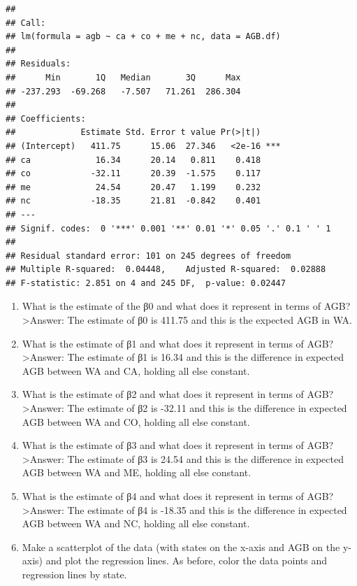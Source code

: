 \documentclass[
]{article}
\begin{document}
\begin{verbatim}
## 
## Call:
## lm(formula = agb ~ ca + co + me + nc, data = AGB.df)
## 
## Residuals:
##      Min       1Q   Median       3Q      Max 
## -237.293  -69.268   -7.507   71.261  286.304 
## 
## Coefficients:
##             Estimate Std. Error t value Pr(>|t|)    
## (Intercept)   411.75      15.06  27.346   <2e-16 ***
## ca             16.34      20.14   0.811    0.418    
## co            -32.11      20.39  -1.575    0.117    
## me             24.54      20.47   1.199    0.232    
## nc            -18.35      21.81  -0.842    0.401    
## ---
## Signif. codes:  0 '***' 0.001 '**' 0.01 '*' 0.05 '.' 0.1 ' ' 1
## 
## Residual standard error: 101 on 245 degrees of freedom
## Multiple R-squared:  0.04448,    Adjusted R-squared:  0.02888 
## F-statistic: 2.851 on 4 and 245 DF,  p-value: 0.02447
\end{verbatim}

\begin{enumerate}
\def\labelenumi{\alph{enumi}.}
\item
  What is the estimate of the β0 and what does it represent in terms of
  AGB? \textgreater Answer: The estimate of β0 is 411.75 and this is the
  expected AGB in WA.
\item
  What is the estimate of β1 and what does it represent in terms of AGB?
  \textgreater Answer: The estimate of β1 is 16.34 and this is the
  difference in expected AGB between WA and CA, holding all else
  constant.
\item
  What is the estimate of β2 and what does it represent in terms of AGB?
  \textgreater Answer: The estimate of β2 is -32.11 and this is the
  difference in expected AGB between WA and CO, holding all else
  constant.
\item
  What is the estimate of β3 and what does it represent in terms of AGB?
  \textgreater Answer: The estimate of β3 is 24.54 and this is the
  difference in expected AGB between WA and ME, holding all else
  constant.
\item
  What is the estimate of β4 and what does it represent in terms of AGB?
  \textgreater Answer: The estimate of β4 is -18.35 and this is the
  difference in expected AGB between WA and NC, holding all else
  constant.
\item
  Make a scatterplot of the data (with states on the x-axis and AGB on
  the y-axis) and plot the regression lines. As before, color the data
  points and regression lines by state.
\end{enumerate}
\end{document}
